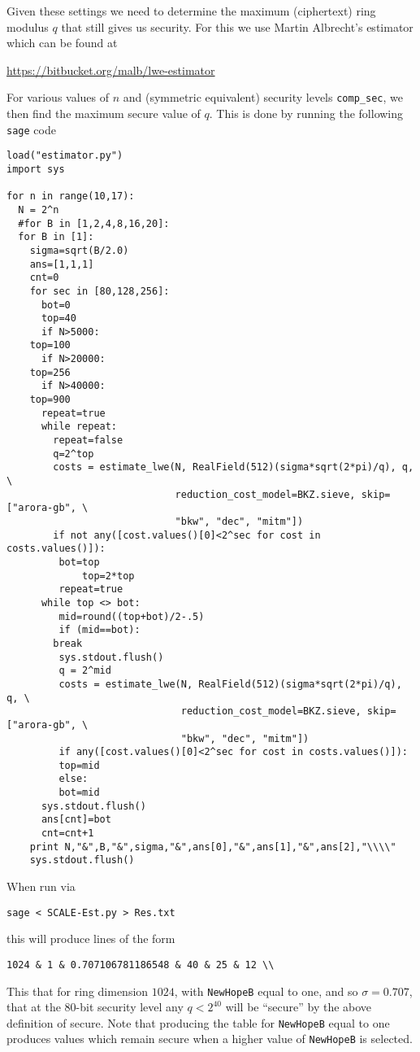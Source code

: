 Given these settings we need to determine the maximum
(ciphertext) ring modulus $q$ that still gives us security.
For this we use Martin Albrecht's estimator which can
be found at
\begin{center}
  \url{https://bitbucket.org/malb/lwe-estimator}
\end{center}
For various values of $n$ and (symmetric equivalent)
security levels \verb+comp_sec+, we then find the maximum secure
value of $q$.
This is done by running the following \verb+sage+ code
\begin{verbatim}
load("estimator.py")
import sys

for n in range(10,17):
  N = 2^n
  #for B in [1,2,4,8,16,20]:
  for B in [1]:
    sigma=sqrt(B/2.0)
    ans=[1,1,1]
    cnt=0
    for sec in [80,128,256]:
      bot=0
      top=40
      if N>5000:
	top=100
      if N>20000:
	top=256
      if N>40000:
	top=900
      repeat=true
      while repeat:
        repeat=false
        q=2^top
        costs = estimate_lwe(N, RealField(512)(sigma*sqrt(2*pi)/q), q, \
                             reduction_cost_model=BKZ.sieve, skip=["arora-gb", \
                             "bkw", "dec", "mitm"])
        if not any([cost.values()[0]<2^sec for cost in costs.values()]):
	     bot=top
             top=2*top
	     repeat=true
      while top <> bot:
         mid=round((top+bot)/2-.5)
         if (mid==bot):
		break
         sys.stdout.flush()
         q = 2^mid
         costs = estimate_lwe(N, RealField(512)(sigma*sqrt(2*pi)/q), q, \
                              reduction_cost_model=BKZ.sieve, skip=["arora-gb", \
                              "bkw", "dec", "mitm"])
         if any([cost.values()[0]<2^sec for cost in costs.values()]):
	     top=mid
         else:
	     bot=mid
      sys.stdout.flush()
      ans[cnt]=bot
      cnt=cnt+1
    print N,"&",B,"&",sigma,"&",ans[0],"&",ans[1],"&",ans[2],"\\\\"
    sys.stdout.flush()
\end{verbatim}
When run via
\begin{center}
  \verb+sage < SCALE-Est.py > Res.txt+
\end{center}
this will produce lines of the form
\begin{center}
  \verb+1024 & 1 & 0.707106781186548 & 40 & 25 & 12 \\+
\end{center}
This that for ring dimension $1024$, with \verb+NewHopeB+ equal to
one, and so $\sigma=0.707$, that at the 80-bit security level any $q < 2^{40}$ will
be ``secure'' by the above definition of secure.
Note that producing the table for \verb+NewHopeB+ equal to one produces
values which remain secure when a higher value of \verb+NewHopeB+ is selected.

